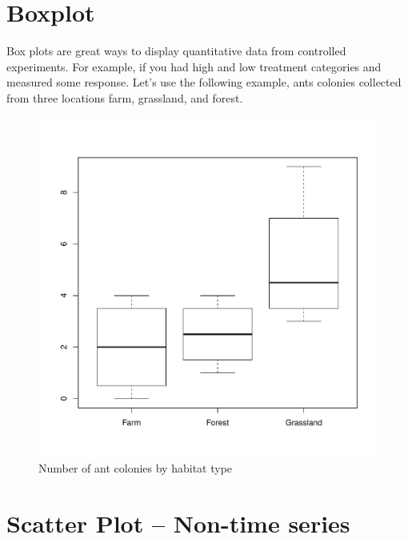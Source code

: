 \documentclass{article}\usepackage[]{graphicx}\usepackage[]{color}
\makeatletter
\def\maxwidth{ %
  \ifdim\Gin@nat@width>\linewidth
    \linewidth
  \else
    \Gin@nat@width
  \fi
}
\newenvironment{knitrout}{}{} %
\makeatother
\begin{document}
\section{Boxplot}

Box plots are great ways to display quantitative data from controlled experiments. For example, if you had high and low treatment categories and measured some response. Let's use the following example, ants colonies collected from three locations farm, grassland, and forest. 

\begin{knitrout}
\color{fgcolor}\begin{figure}
\includegraphics[width=\maxwidth]{figure/unnamed-chunk-6-1} \caption[Number of ant colonies by habitat type]{Number of ant colonies by habitat type}\label{fig:unnamed-chunk-6}
\end{figure}


\end{knitrout}
\newpage
\section{Scatter Plot -- Non-time series}

\end{document}
